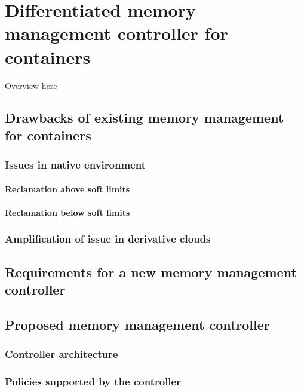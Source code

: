 
\chapter{Differentiated memory management controller for containers}

  Overview here
  
  \section{Drawbacks of existing memory management for containers}
  
    \subsection{Issues in native environment}
    
      \subsubsection{Reclamation above soft limits}
      
      \subsubsection{Reclamation below soft limits}
   
    \subsection{Amplification of issue in derivative clouds}
  
  
   
  \section{Requirements for a new memory management controller}
      
    
  
  \section{Proposed memory management controller}
    
      \subsection{Controller architecture}
    
      \subsection{Policies supported by the controller}
	
